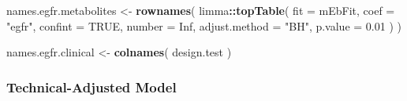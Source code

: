\documentclass[]{article}
\newenvironment{Shaded}{\begin{snugshade}}{\end{snugshade}}
\newcommand{\DataTypeTok}[1]{\textcolor[rgb]{0.13,0.29,0.53}{#1}}
\newcommand{\FloatTok}[1]{\textcolor[rgb]{0.00,0.00,0.81}{#1}}
\newcommand{\KeywordTok}[1]{\textcolor[rgb]{0.13,0.29,0.53}{\textbf{#1}}}
\newcommand{\NormalTok}[1]{#1}
\newcommand{\OperatorTok}[1]{\textcolor[rgb]{0.81,0.36,0.00}{\textbf{#1}}}
\newcommand{\OtherTok}[1]{\textcolor[rgb]{0.56,0.35,0.01}{#1}}
\newcommand{\StringTok}[1]{\textcolor[rgb]{0.31,0.60,0.02}{#1}}
\begin{document}
\begin{Shaded}
\begin{Highlighting}[]
\NormalTok{names.egfr.metabolites <-}\StringTok{ }
\StringTok{  }\KeywordTok{rownames}\NormalTok{( }
\NormalTok{    limma}\OperatorTok{::}\KeywordTok{topTable}\NormalTok{( }
      \DataTypeTok{fit =}\NormalTok{ mEbFit,}
      \DataTypeTok{coef =} \StringTok{"egfr"}\NormalTok{, }
      \DataTypeTok{confint =} \OtherTok{TRUE}\NormalTok{,}
      \DataTypeTok{number =} \OtherTok{Inf}\NormalTok{,}
      \DataTypeTok{adjust.method =} \StringTok{"BH"}\NormalTok{, }
      \DataTypeTok{p.value =} \FloatTok{0.01}
\NormalTok{    )}
\NormalTok{  )}

\NormalTok{names.egfr.clinical <-}\StringTok{ }\KeywordTok{colnames}\NormalTok{( design.test )}
\end{Highlighting}
\end{Shaded}

\newpage

\hypertarget{technical-adjusted-model}{%
\subsubsection{Technical-Adjusted
Model}\label{technical-adjusted-model}}
\end{document}

